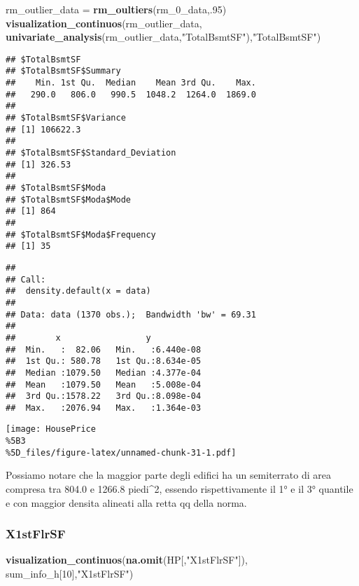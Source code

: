 \documentclass[
]{article}
\newenvironment{Shaded}{\begin{snugshade}}{\end{snugshade}}
\newcommand{\DecValTok}[1]{\textcolor[rgb]{0.00,0.00,0.81}{#1}}
\newcommand{\FunctionTok}[1]{\textcolor[rgb]{0.13,0.29,0.53}{\textbf{#1}}}
\newcommand{\NormalTok}[1]{#1}
\newcommand{\OtherTok}[1]{\textcolor[rgb]{0.56,0.35,0.01}{#1}}
\newcommand{\StringTok}[1]{\textcolor[rgb]{0.31,0.60,0.02}{#1}}
\begin{document}
\begin{Shaded}
\begin{Highlighting}[]
\NormalTok{rm\_outlier\_data }\OtherTok{=} \FunctionTok{rm\_oultiers}\NormalTok{(rm\_0\_data,.}\DecValTok{95}\NormalTok{)}
\FunctionTok{visualization\_continuos}\NormalTok{(rm\_outlier\_data, }\FunctionTok{univariate\_analysis}\NormalTok{(rm\_outlier\_data,}\StringTok{"TotalBsmtSF"}\NormalTok{),}\StringTok{"TotalBsmtSF"}\NormalTok{)}
\end{Highlighting}
\end{Shaded}

\begin{verbatim}
## $TotalBsmtSF
## $TotalBsmtSF$Summary
##    Min. 1st Qu.  Median    Mean 3rd Qu.    Max. 
##   290.0   806.0   990.5  1048.2  1264.0  1869.0 
## 
## $TotalBsmtSF$Variance
## [1] 106622.3
## 
## $TotalBsmtSF$Standard_Deviation
## [1] 326.53
## 
## $TotalBsmtSF$Moda
## $TotalBsmtSF$Moda$Mode
## [1] 864
## 
## $TotalBsmtSF$Moda$Frequency
## [1] 35
\end{verbatim}

\begin{verbatim}
## 
## Call:
##  density.default(x = data)
## 
## Data: data (1370 obs.);  Bandwidth 'bw' = 69.31
## 
##        x                 y            
##  Min.   :  82.06   Min.   :6.440e-08  
##  1st Qu.: 580.78   1st Qu.:8.634e-05  
##  Median :1079.50   Median :4.377e-04  
##  Mean   :1079.50   Mean   :5.008e-04  
##  3rd Qu.:1578.22   3rd Qu.:8.098e-04  
##  Max.   :2076.94   Max.   :1.364e-03
\end{verbatim}

\texttt{[image: HousePrice\\\%5B3\\\%5D\_files/figure-latex/unnamed-chunk-31-1.pdf]}

Possiamo notare che la maggior parte degli edifici ha un semiterrato di
area compresa tra 804.0 e 1266.8 piedi\^{}2, essendo rispettivamente il
1° e il 3° quantile e con maggior densita alineati alla retta qq della
norma.

\subsubsection{X1stFlrSF}\label{x1stflrsf}

\begin{Shaded}
\begin{Highlighting}[]
\FunctionTok{visualization\_continuos}\NormalTok{(}\FunctionTok{na.omit}\NormalTok{(HP[,}\StringTok{"X1stFlrSF"}\NormalTok{]), sum\_info\_h[}\DecValTok{10}\NormalTok{],}\StringTok{"X1stFlrSF"}\NormalTok{)}
\end{Highlighting}
\end{Shaded}
\end{document}
